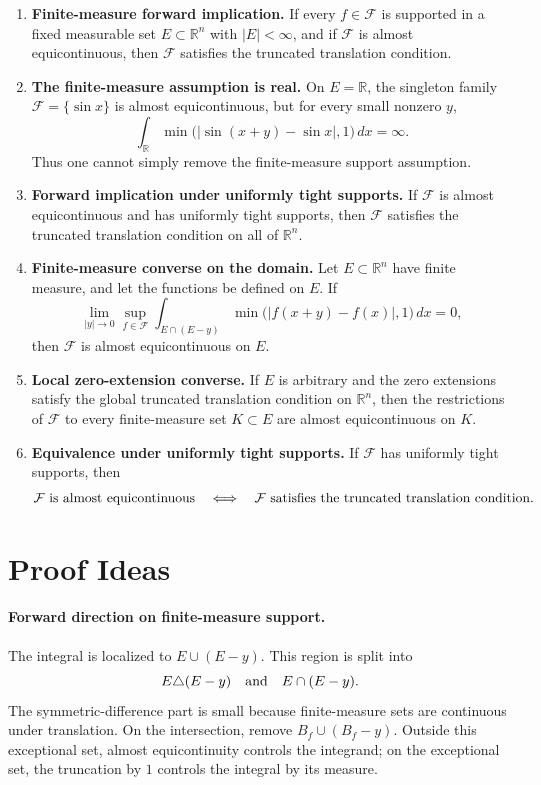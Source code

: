 \documentclass[11pt]{article}
\newcommand{\R}{\mathbb{R}}
\newcommand{\F}{\mathcal{F}}
\newcommand{\meas}[1]{\lvert #1\rvert}
\begin{document}
\begin{enumerate}[label=\textbf{R\arabic*.},leftmargin=*]
    \item \textbf{Finite-measure forward implication.}
    If every $f\in\F$ is supported in a fixed measurable set
    $E\subset\R^n$ with $\meas{E}<\infty$, and if $\F$ is almost
    equicontinuous, then $\F$ satisfies the truncated translation condition.

    \item \textbf{The finite-measure assumption is real.}
    On $E=\R$, the singleton family $\F=\{\sin x\}$ is almost
    equicontinuous, but for every small nonzero $y$,
    \[
        \int_{\R}\min\bigl(|\sin(x+y)-\sin x|,1\bigr)\,dx=\infty.
    \]
    Thus one cannot simply remove the finite-measure support assumption.

    \item \textbf{Forward implication under uniformly tight supports.}
    If $\F$ is almost equicontinuous and has uniformly tight supports, then
    $\F$ satisfies the truncated translation condition on all of $\R^n$.

    \item \textbf{Finite-measure converse on the domain.}
    Let $E\subset\R^n$ have finite measure, and let the functions be defined
    on $E$. If
    \[
        \lim_{|y|\to0}\sup_{f\in\F}
        \int_{E\cap(E-y)}
        \min\bigl(|f(x+y)-f(x)|,1\bigr)\,dx=0,
    \]
    then $\F$ is almost equicontinuous on $E$.

    \item \textbf{Local zero-extension converse.}
    If $E$ is arbitrary and the zero extensions satisfy the global truncated
    translation condition on $\R^n$, then the restrictions of $\F$ to every
    finite-measure set $K\subset E$ are almost equicontinuous on $K$.

    \item \textbf{Equivalence under uniformly tight supports.}
    If $\F$ has uniformly tight supports, then
    \[
        \F\hbox{ is almost equicontinuous}
        \quad\Longleftrightarrow\quad
        \F\hbox{ satisfies the truncated translation condition}.
    \]
\end{enumerate}

\section*{Proof Ideas}

\paragraph{Forward direction on finite-measure support.}
The integral is localized to $E\cup(E-y)$. This region is split into
\[
    E\triangle(E-y)
    \quad\hbox{and}\quad
    E\cap(E-y).
\]
The symmetric-difference part is small because finite-measure sets are
continuous under translation. On the intersection, remove
$B_f\cup(B_f-y)$. Outside this exceptional set, almost equicontinuity controls
the integrand; on the exceptional set, the truncation by $1$ controls the
integral by its measure.
\end{document}
